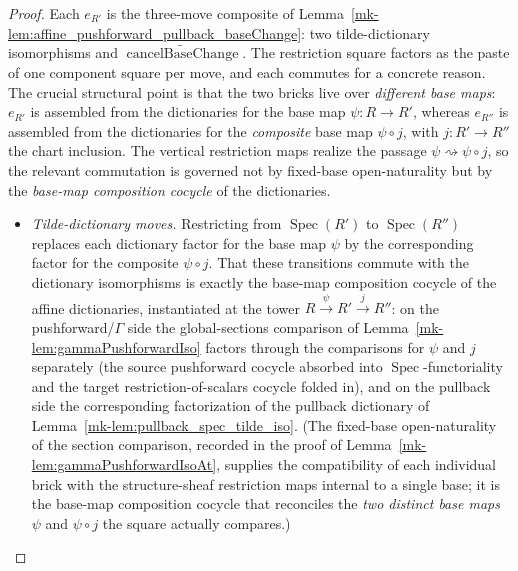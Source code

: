 \begin{proof}
  Each \(e_{R'}\) is the three-move composite of
  Lemma~\ref{mk-lem:affine_pushforward_pullback_baseChange}: two tilde-dictionary
  isomorphisms and \(\widetilde{\operatorname{cancelBaseChange}}\). The restriction
  square factors as the paste of one component square per move, and each commutes for a
  concrete reason. The crucial structural point is that the two bricks live over
  \emph{different base maps}: \(e_{R'}\) is assembled from the dictionaries for the base map
  \(\psi : R \to R'\), whereas \(e_{R''}\) is assembled from the dictionaries for the
  \emph{composite} base map \(\psi \circ j\), with \(j : R' \to R''\) the chart inclusion.
  The vertical restriction maps realize the passage \(\psi \rightsquigarrow \psi\circ j\), so
  the relevant commutation is governed not by fixed-base open-naturality but by the
  \emph{base-map composition cocycle} of the dictionaries.
  \begin{itemize}
    \item \emph{Tilde-dictionary moves.} Restricting from \(\operatorname{Spec}(R')\)
      to \(\operatorname{Spec}(R'')\) replaces each dictionary factor for the base map
      \(\psi\) by the corresponding factor for the composite \(\psi\circ j\). That these
      transitions commute with the dictionary isomorphisms is exactly the base-map
      composition cocycle of the affine dictionaries, instantiated at the tower
      \(R \xrightarrow{\psi} R' \xrightarrow{j} R''\): on the pushforward/\(\Gamma\) side the
      global-sections comparison of Lemma~\ref{mk-lem:gammaPushforwardIso} factors through the
      comparisons for \(\psi\) and \(j\) separately (the source pushforward cocycle absorbed into
      \(\operatorname{Spec}\)-functoriality and the target restriction-of-scalars cocycle folded
      in), and on the pullback side the corresponding factorization of the pullback dictionary of
      Lemma~\ref{mk-lem:pullback_spec_tilde_iso}. (The fixed-base open-naturality of the section
      comparison, recorded in the proof of Lemma~\ref{mk-lem:gammaPushforwardIsoAt}, supplies the
      compatibility of each individual brick with the structure-sheaf restriction maps internal
      to a single base; it is the base-map composition cocycle that reconciles the \emph{two
      distinct base maps} \(\psi\) and \(\psi\circ j\) the square actually compares.)

\end{itemize}
\end{proof}
